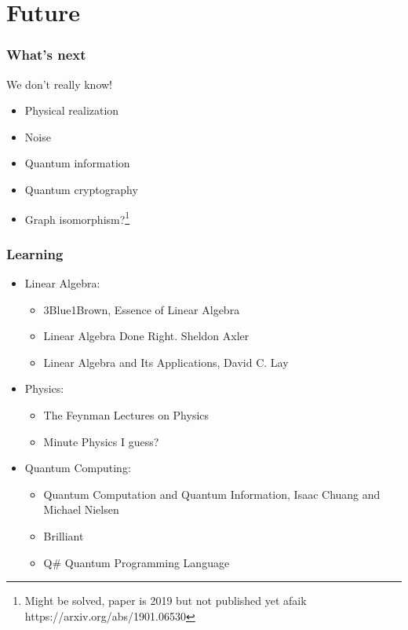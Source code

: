 \documentclass{beamer}
\begin{document}
        \section{Future}
        \begin{frame}
            \frametitle{What's next}
            We don't really know!
            \begin{itemize}
                \item Physical realization
                \item Noise
                \item Quantum information
                \item Quantum cryptography
                \item Graph isomorphism?\footnote{Might be solved, paper is 2019 but not published yet afaik https://arxiv.org/abs/1901.06530}
            \end{itemize}
        \end{frame}
        \begin{frame}
            \frametitle{Learning}
            \begin{itemize}
                \item Linear Algebra: \begin{itemize}
                    \item 3Blue1Brown, Essence of Linear Algebra
                    \item Linear Algebra Done Right. Sheldon Axler
                    \item Linear Algebra and Its Applications, David C. Lay
                \end{itemize}
                \item Physics: \begin{itemize}
                    \item  The Feynman Lectures on Physics 
                    \item Minute Physics I guess?
                \end{itemize}
                \item Quantum Computing: \begin{itemize}
                    \item Quantum Computation and Quantum Information, Isaac Chuang and Michael Nielsen
                    \item Brilliant
                    \item Q\# Quantum Programming Language
                \end{itemize}
            \end{itemize}
        \end{frame}
    
\end{document}

